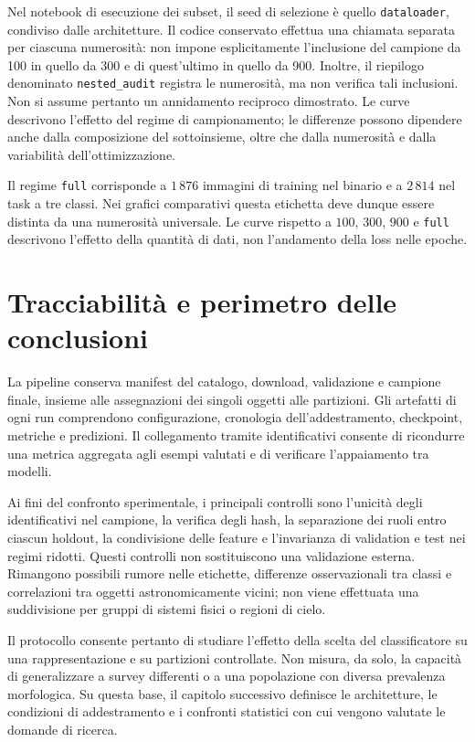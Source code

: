 Nel notebook di esecuzione dei subset, il seed di selezione è quello
\texttt{dataloader}, condiviso dalle architetture. Il codice conservato
effettua una chiamata separata per ciascuna numerosità: non impone
esplicitamente l'inclusione del campione da 100 in quello da 300 e
di quest'ultimo in quello da 900. Inoltre, il riepilogo denominato
\texttt{nested\_audit} registra le numerosità, ma non verifica tali
inclusioni. Non si assume pertanto un annidamento reciproco dimostrato.
Le curve descrivono l'effetto del regime di campionamento; le differenze
possono dipendere anche dalla composizione del sottoinsieme, oltre che
dalla numerosità e dalla variabilità dell'ottimizzazione.

Il regime \texttt{full} corrisponde a \(1\,876\) immagini di training nel
binario e a \(2\,814\) nel task a tre classi. Nei grafici comparativi
questa etichetta deve dunque essere distinta da una numerosità universale.
Le curve rispetto a \(100\), \(300\), \(900\) e \texttt{full} descrivono
l'effetto della quantità di dati, non l'andamento della loss nelle epoche.

\section{Tracciabilità e perimetro delle conclusioni}
\label{sec:tracciabilita}

La pipeline conserva manifest del catalogo, download, validazione e
campione finale, insieme alle assegnazioni dei singoli oggetti alle
partizioni. Gli artefatti di ogni run comprendono configurazione,
cronologia dell'addestramento, checkpoint, metriche e predizioni.
Il collegamento tramite identificativi consente di ricondurre una metrica
aggregata agli esempi valutati e di verificare l'appaiamento tra modelli.

Ai fini del confronto sperimentale, i principali controlli sono
l'unicità degli identificativi nel campione, la verifica degli hash,
la separazione dei ruoli entro ciascun holdout, la condivisione delle
feature e l'invarianza di validation e test nei regimi ridotti.
Questi controlli non sostituiscono una validazione esterna. Rimangono
possibili rumore nelle etichette, differenze osservazionali tra classi
e correlazioni tra oggetti astronomicamente vicini; non viene effettuata
una suddivisione per gruppi di sistemi fisici o regioni di cielo.

Il protocollo consente pertanto di studiare l'effetto della scelta del
classificatore su una rappresentazione e su partizioni controllate.
Non misura, da solo, la capacità di generalizzare a survey differenti
o a una popolazione con diversa prevalenza morfologica. Su questa base,
il capitolo successivo definisce le architetture, le condizioni di
addestramento e i confronti statistici con cui vengono valutate le
domande di ricerca.
